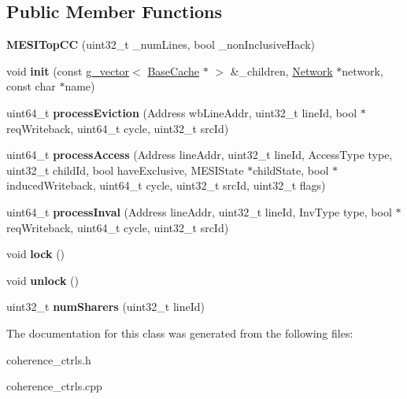 \subsection*{Public Member Functions}
\begin{DoxyCompactItemize}
\item 
\hypertarget{classMESITopCC_a0302722a6c769131461710395c808d6f}{{\bfseries M\-E\-S\-I\-Top\-C\-C} (uint32\-\_\-t \-\_\-num\-Lines, bool \-\_\-non\-Inclusive\-Hack)}\label{classMESITopCC_a0302722a6c769131461710395c808d6f}

\item 
\hypertarget{classMESITopCC_a1d0b9de1944d94b1c4a738f1bb826087}{void {\bfseries init} (const \hyperlink{classg__vector}{g\-\_\-vector}$<$ \hyperlink{classBaseCache}{Base\-Cache} $\ast$ $>$ \&\-\_\-children, \hyperlink{classNetwork}{Network} $\ast$network, const char $\ast$name)}\label{classMESITopCC_a1d0b9de1944d94b1c4a738f1bb826087}

\item 
\hypertarget{classMESITopCC_aa44dfd0280f94f9339fcaf8dc0e20269}{uint64\-\_\-t {\bfseries process\-Eviction} (Address wb\-Line\-Addr, uint32\-\_\-t line\-Id, bool $\ast$req\-Writeback, uint64\-\_\-t cycle, uint32\-\_\-t src\-Id)}\label{classMESITopCC_aa44dfd0280f94f9339fcaf8dc0e20269}

\item 
\hypertarget{classMESITopCC_aed318f9fff1699380161f8635fefc791}{uint64\-\_\-t {\bfseries process\-Access} (Address line\-Addr, uint32\-\_\-t line\-Id, Access\-Type type, uint32\-\_\-t child\-Id, bool have\-Exclusive, M\-E\-S\-I\-State $\ast$child\-State, bool $\ast$induced\-Writeback, uint64\-\_\-t cycle, uint32\-\_\-t src\-Id, uint32\-\_\-t flags)}\label{classMESITopCC_aed318f9fff1699380161f8635fefc791}

\item 
\hypertarget{classMESITopCC_a6eb7b6c5e4942218526507909627b260}{uint64\-\_\-t {\bfseries process\-Inval} (Address line\-Addr, uint32\-\_\-t line\-Id, Inv\-Type type, bool $\ast$req\-Writeback, uint64\-\_\-t cycle, uint32\-\_\-t src\-Id)}\label{classMESITopCC_a6eb7b6c5e4942218526507909627b260}

\item 
\hypertarget{classMESITopCC_a8cb3d0e20bc11cb818c0e179c9f31a4c}{void {\bfseries lock} ()}\label{classMESITopCC_a8cb3d0e20bc11cb818c0e179c9f31a4c}

\item 
\hypertarget{classMESITopCC_a24cc9111c6f1b6afa6ec60ba9005a42a}{void {\bfseries unlock} ()}\label{classMESITopCC_a24cc9111c6f1b6afa6ec60ba9005a42a}

\item 
\hypertarget{classMESITopCC_a32a67ec6f7c028fd128c59d74468eee5}{uint32\-\_\-t {\bfseries num\-Sharers} (uint32\-\_\-t line\-Id)}\label{classMESITopCC_a32a67ec6f7c028fd128c59d74468eee5}

\end{DoxyCompactItemize}


The documentation for this class was generated from the following files\-:\begin{DoxyCompactItemize}
\item 
coherence\-\_\-ctrls.\-h\item 
coherence\-\_\-ctrls.\-cpp\end{DoxyCompactItemize}
